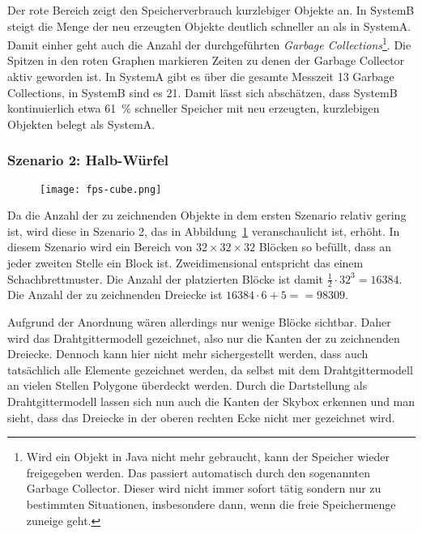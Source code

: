 Der rote Bereich zeigt den Speicherverbrauch kurzlebiger Objekte an. In SystemB steigt die Menge der neu erzeugten Objekte deutlich schneller an als in SystemA. Damit einher geht auch die Anzahl der durchgeführten \emph{Garbage Collections}\footnote{Wird ein Objekt in Java nicht mehr gebraucht, kann der Speicher wieder freigegeben werden. Das passiert automatisch durch den sogenannten Garbage Collector. Dieser wird nicht immer sofort tätig sondern nur zu bestimmten Situationen, insbesondere dann, wenn die freie Speichermenge zuneige geht.}. Die Spitzen in den roten Graphen markieren Zeiten zu denen der Garbage Collector aktiv geworden ist. In SystemA gibt es über die gesamte Messzeit 13 Garbage Collections, in SystemB sind es 21. Damit lässt sich abschätzen, dass SystemB kontinuierlich etwa \SI{61}{\percent} schneller Speicher mit neu erzeugten, kurzlebigen Objekten belegt als SystemA.

\subsubsection{Szenario 2: Halb-Würfel}
\begin{figure}
	\centering
	\texttt{[image: fps-cube.png]}
	\caption{}\label{fig:cube}
\end{figure}
Da die Anzahl der zu zeichnenden Objekte in dem ersten Szenario relativ gering ist, wird diese in Szenario 2, das in Abbildung~\ref{fig:cube} veranschaulicht ist, erhöht. In diesem Szenario wird ein Bereich von $32 \times 32 \times 32$ Blöcken so befüllt, dass an jeder zweiten Stelle ein Block ist. Zweidimensional entspricht das einem Schachbrettmuster. Die Anzahl der platzierten Blöcke ist damit $\frac{1}{2}\cdot32^3 = 16384$. Die Anzahl der zu zeichnenden Dreiecke ist $16384\cdot6 + 5= = 98309$.

Aufgrund der Anordnung wären allerdings nur wenige Blöcke sichtbar. Daher wird das Drahtgittermodell gezeichnet, also nur die Kanten der zu zeichnenden Dreiecke. Dennoch kann hier nicht mehr sichergestellt werden, dass auch tatsächlich alle Elemente gezeichnet werden, da selbst mit dem Drahtgittermodell an vielen Stellen Polygone überdeckt werden. Durch die Dartstellung als Drahtgittermodell lassen sich nun auch die Kanten der Skybox erkennen und man sieht, dass das Dreiecke in der oberen rechten Ecke nicht mer gezeichnet wird.

\begin{figure}[!htbp]
	\caption{}\label{fig:seed-0-cube-fps}
\end{figure}

